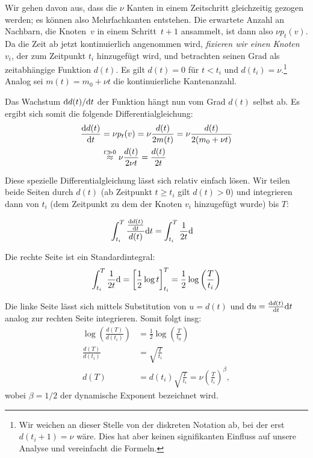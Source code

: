 Wir gehen davon aus, dass die $\nu$ Kanten in einem Zeitschritt gleichzeitig gezogen werden;
es können also Mehrfachkanten entstehen.
Die erwartete Anzahl an Nachbarn, die Knoten~$v$ in einem Schritt~$t+1$ ansammelt, ist dann also $\nu p_t(v)$.
Da die Zeit ab jetzt kontinuierlich angenommen wird, \emph{fixieren wir einen Knoten $v_i$}, der zum Zeitpunkt $t_i$ hinzugefügt wird, und betrachten seinen Grad als zeitabhängige Funktion $d(t)$.
Es gilt $d(t) = 0$ für $t < t_i$ und $d(t_i) = \nu$.\footnote{
    Wir weichen an dieser Stelle von der diskreten Notation ab, bei der erst $d(t_i + 1) = \nu$ wäre.
    Dies hat aber keinen signifikanten Einfluss auf unsere Analyse und vereinfacht die Formeln.
}
Analog sei $m(t) = m_0 + \nu t$ die kontinuierliche Kantenanzahl.

Das Wachstum $\text d d(t) / \text d t$ der Funktion hängt nun vom Grad $d(t)$ selbst ab.
Es ergibt sich somit die folgende Differentialgleichung:
\begin{align}
    \frac{\text d d(t)}{\text d t}
     & = \nu p_t(v)
    = \nu \frac{d(t)}{2 m(t)}
    = \nu \frac{d(t)}{2(m_0 + \nu t)}                                         \\
     & \stackrel{t \gg 0}{\approx} \nu \frac{d(t)}{2 \nu t} = \frac{d(t)}{2t}
\end{align}

Diese spezielle Differentialgleichung lässt sich relativ einfach lösen.
Wir teilen beide Seiten durch $d(t)$ (ab Zeitpunkt $t \ge t_i$ gilt $d(t) > 0$) und integrieren dann von $t_i$ (dem Zeitpunkt zu dem der Knoten $v_i$ hinzugefügt wurde) bis $T$:

\begin{align}
    \int_{t_i}^T  \frac{\frac{\text d d(t)}{\text d t}}{d(t)} \text d t & = \int_{t_i}^T \frac{1}{2t} \text d
\end{align}

\noindent
Die rechte Seite ist ein Standardintegral:
\begin{align}
    \int_{t_i}^T \frac{1}{2t} \text d = \left[ \frac 1 2 \log t \right]_{t_i}^T = \frac 1 2 \log\left(\frac{T}{t_i}\right)
\end{align}

Die linke Seite lässt sich mittels Substitution von $u = d(t)$ und $\text d u = \frac{\text d d(t)}{\text d t} \text d t$ analog zur rechten Seite integrieren.
Somit folgt insg:
\begin{align}
    \log\left(\frac{d(T)}{d(t_i)}\right) & = \frac 1 2 \log \left(\frac{T}{t_0}\right)                             \\
    \frac{d(T)}{d(t_i)}                  & = \sqrt{\frac{T}{t_i}}                                                  \\
    d(T)                                 & = d(t_i) \sqrt{\frac{T}{t_i}} = \nu \left( \frac{T}{t_i} \right)^\beta,
\end{align}
wobei $\beta = 1/2$ der  dynamische Exponent bezeichnet wird.

